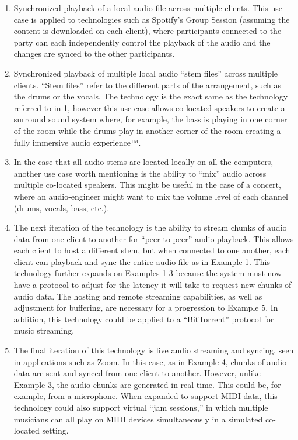 \documentclass[%
               nonacm,sigconf,10pt]{acmart}
\begin{document}
\begin{enumerate}
    \item Synchronized playback of a local audio file across multiple clients. This use-case is applied to technologies such as Spotify's Group Session (assuming the content is downloaded on each client), where participants connected to the party can each independently control the playback of the audio and the changes are synced to the other participants. 
    \item Synchronized playback of multiple local audio ``stem files'' across multiple clients. ``Stem files'' refer to the different parts of the arrangement, such as the drums or the vocals. The technology is the exact same as the technology referred to in 1, however this use case allows co-located speakers to create a surround sound system where, for example, the bass is playing in one corner of the room while the drums play in another corner of the room creating a fully immersive audio experience™.
    \item In the case that all audio-stems are located locally on all the computers, another use case worth mentioning is the ability to ``mix'' audio across multiple co-located speakers. This might be useful in the case of a concert, where an audio-engineer might want to mix the volume level of each channel (drums, vocals, bass, etc.). 
    \item The next iteration of the technology is the ability to stream chunks of audio data from one client to another for ``peer-to-peer'' audio playback. This allows each client to host a different stem, but when connected to one another, each client can playback and sync the entire audio file as in Example 1. This technology further expands on Examples 1-3 because the system must now have a protocol to adjust for the latency it will take to request new chunks of audio data. The hosting and remote streaming capabilities, as well as adjustment for buffering, are necessary for a progression to Example 5. In addition, this technology could be applied to a ``BitTorrent'' protocol for music streaming.
    \item The final iteration of this technology is live audio streaming and syncing, seen in applications such as Zoom. In this case, as in Example 4, chunks of audio data are sent and synced from one client to another. However, unlike Example 3, the audio chunks are generated in real-time. This could be, for example, from a microphone. When expanded to support MIDI data, this technology could also support virtual ``jam sessions,'' in which multiple musicians can all play on MIDI devices simultaneously in a simulated co-located setting.
\end{enumerate}
\end{document}
